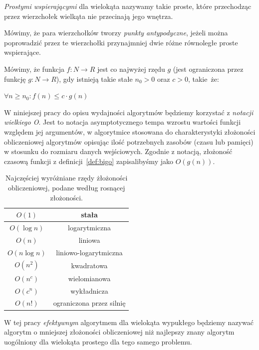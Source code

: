 \begin{definicja}
  \emph{Prostymi wspierającymi} dla wielokąta nazywamy takie proste, które
  przechodząc przez wierzchołek wielkąta nie przecinają jego wnętrza.
\end{definicja}

\begin{definicja}
  Mówimy, że para wierzchołków tworzy \emph{punkty antypodyczne},
  jeżeli można poprowadzić przez te wierzchołki przynajmniej dwie
  różne równoległe proste wspierające.
\end{definicja}

\begin{definicja}
  \label{def:bigo}
  Mówimy, że funkcja $f\colon N \to R$ jest co najwyżej rzędu $g$
  (jest ograniczona przez funkcję $g\colon N \to R$), gdy istnieją
  takie stałe $n_0 > 0$ oraz $c > 0$, takie~że:

  \begin{center}
    $\forall n \geq n_0 : f(n) \leq c \cdot g(n)$
  \end{center}
\end{definicja}

W niniejszej pracy do opisu wydajności algorytmów będziemy korzystać z
\emph{notacji wielkiego O}. Jest to notacja asymptotycznego tempa
wzrostu wartości funkcji względem jej argumentów, w algorytmice
stosowana do charakterystyki złożoności obliczeniowej algorytmów
opisując ilość potrzebnych zasobów (czasu lub pamięci) w stosunku do
rozmiaru danych wejściowych. Zgodnie z notacją, złożoność czasową
funkcji z definicji~\ref{def:bigo} zapisalibyśmy jako $O(g(n))$.

\begin{table}[htp]
  \centering
  \caption{Najczęściej wyróżniane rzędy żłożoności obliczeniowej,
    podane według rosnącej złożoności.}
  \begin{tabular}{c c}
    $O(1)$ & stała \\
    \hline
    $O(\log n)$ & logarytmiczna \\
    \hline
    $O(n)$ & liniowa \\
    \hline
    $O(n \log n)$ & liniowo-logarytmiczna \\
    \hline
    $O(n^2)$ & kwadratowa \\
    \hline
    $O(n^c)$ & wielomianowa \\
    \hline
    $O(c^n)$ & wykładnicza \\
    \hline
    $O(n!)$ & ograniczona przez silnię \\
  \end{tabular}
\end{table}

W tej pracy \emph{efektywnym} algorytmem dla wielokąta wypukłego będziemy
nazywać algorytm o mniejszej złożoności obliczeniowej niż najlepszy
znany algorytm uogólniony dla wielokąta prostego dla tego samego
problemu.

